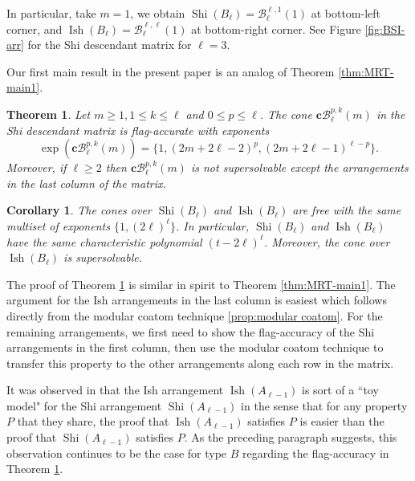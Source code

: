 \documentclass[11pt]{article}
\newtheorem{corollary}[theo]{Corollary}
\newtheorem{theorem}[theo]{Theorem}
\theoremstyle{definition}
\numberwithin{equation}{section}
\DeclareMathOperator{\Shi}{Shi}
\DeclareMathOperator{\Ish}{Ish}
\newcommand{\B}{\mathcal{B}}
\newcommand{\cc}{\mathbf{c}}
\begin{document}
In particular, take $m=1$, we obtain $\Shi(B_\ell) = \B^{\ell,1}_\ell(1)$ at bottom-left corner, and $\Ish(B_\ell) = \B^{\ell,\ell}_\ell(1)$ at bottom-right corner. 
See Figure \ref{fig:BSI-arr} for the Shi descendant  matrix for $\ell=3$.

Our first main result in the present paper is an analog of Theorem \ref{thm:MRT-main1}.
\begin{theorem}
 \label{thm:main-BSI-free-SS}
Let $m\ge 1, 1 \le k \le \ell$ and $0 \le p \le \ell$. 
The cone $\cc\B^{p,k}_\ell(m)$ in the Shi descendant matrix is flag-accurate with exponents 
$$\exp(\cc\B^{p,k}_\ell(m)) = \{1, (2m+2\ell-2)^{p}, (2m+2\ell-1)^{\ell-p}\} .$$ 
Moreover, if $\ell \ge 2$ then $\textbf{c} \B^{p,k}_\ell(m)$ is not supersolvable except the arrangements in the last column of the  matrix.
 \end{theorem}

\begin{corollary}\label{cor:Shi/Ish freeness and char poly}
The cones over $\Shi(B_{\ell})$ and $\Ish(B_{\ell})$ are free with the same multiset of exponents $\{1,(2\ell)^{\ell}\}$.
In particular, $\Shi(B_{\ell})$ and $\Ish(B_{\ell})$ have the same characteristic polynomial $(t-2\ell)^{\ell}$. 
Moreover, the cone over $\Ish(B_{\ell})$ is supersolvable. 
\end{corollary}
 
 The proof of Theorem \ref{thm:main-BSI-free-SS} is similar in spirit to Theorem \ref{thm:MRT-main1}. 
 The argument for the Ish arrangements in the last column is easiest which follows directly from the modular coatom technique \ref{prop:modular coatom}. 
 For the remaining arrangements, we first need to show the flag-accuracy of the Shi arrangements in the first column, then use the modular coatom technique to transfer this property to the other arrangements along each row in the matrix.
 
It was observed in \cite[\S1]{AR12} that the Ish arrangement $ \Ish(A_{\ell-1}) $ is sort of a ``toy model" for the Shi arrangement $ \Shi(A_{\ell-1}) $ in the sense that for any property $P$ that they share, the proof that $ \Ish(A_{\ell-1}) $ satisfies $P$ is easier than the proof that $ \Shi(A_{\ell-1}) $ satisfies $P$. 
 As the preceding paragraph suggests, this observation continues to be the case for type $B$ regarding the flag-accuracy in Theorem \ref{thm:main-BSI-free-SS}.

 
\end{document}
